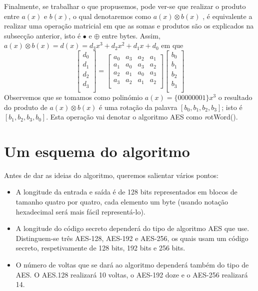 Finalmente, se trabalhar o que propusemos, pode ver-se que realizar o produto entre  $a(x)$ e $b(x)$, o qual denotaremos como $a(x)\otimes b(x)$ , é equivalente a realizar uma operação matricial em que as somas e produtos são os explicados na subsecção anterior, isto é $\bullet$ e $\oplus$  entre bytes. Assim, \mbox{$a(x)\otimes b(x)=d(x)=d_3x^3+d_2 x^2+d_1 x+d_0$} em que
$$
\left[
\begin{array}{c}
d_0\\
d_1\\
d_2\\
d_3\\
\end{array}
\right]=\left[
\begin{array}{cccc}
a_0 & a_3 & a_2 & a_1\\
a_1 & a_0 & a_3 & a_2\\
a_2 & a_1 & a_0 & a_3\\
a_3 & a_2 & a_1 & a_2\\
\end{array}
\right]\left[
\begin{array}{c}
b_0\\
b_1\\
b_2\\
b_3\\
\end{array}
\right]
$$
Observemos que se tomamos como polinómio $a(x)=\{00000001\}x^3$ o resultado do produto de $a(x)\otimes b(x)$ é uma rotação da palavra $[b_0, b_1,b_2,b_3]$; isto é  $[b_1, b_2,b_3,b_0]$. Esta operação vai denotar o algoritmo AES como  {\textsl rotWord()}.
\section{Um esquema do algoritmo}
Antes de dar as ideias do algoritmo, queremos salientar vários pontos:
\begin{itemize}
\item A longitude da entrada e saída é de 128 bits representados em blocos de tamanho quatro por quatro, cada elemento um byte (usando notação hexadecimal será mais fácil representá-lo).
\item A longitude do código secreto dependerá do tipo de algoritmo AES que use. Distinguem-se três AES-128, AES-192 e AES-256, os quais usam um código secreto, respetivamente de 128 bits, 192 bits e 256 bits.
\item O número de voltas que se dará ao algoritmo dependerá também do tipo de AES. O AES.128 realizará 10 voltas, o AES-192 doze e o AES-256 realizará 14.
\end{itemize} 

